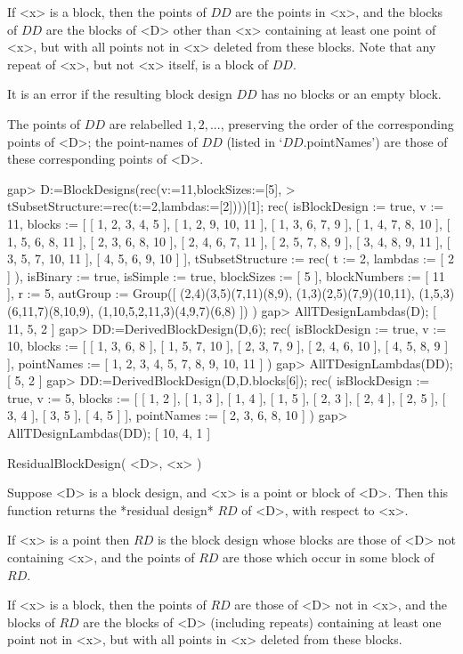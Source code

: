If <x> is a block, then the points of $DD$ are the points in <x>, and
the blocks of $DD$ are the blocks of <D> other than <x> containing at
least one point of <x>, but with all points not in <x> deleted from
these blocks.  Note that any repeat of <x>, but not <x> itself, is a
block of $DD$.

It is an error if the resulting block design $DD$ has no blocks or an
empty block.

The points of $DD$ are relabelled $1,2,...$, preserving the order of
the corresponding points of <D>; the point-names of $DD$ (listed in
`$DD$.pointNames') are those of these corresponding points of <D>.

\beginexample
gap> D:=BlockDesigns(rec(v:=11,blockSizes:=[5],
>       tSubsetStructure:=rec(t:=2,lambdas:=[2])))[1];
rec( isBlockDesign := true, v := 11, 
  blocks := [ [ 1, 2, 3, 4, 5 ], [ 1, 2, 9, 10, 11 ], [ 1, 3, 6, 7, 9 ], 
      [ 1, 4, 7, 8, 10 ], [ 1, 5, 6, 8, 11 ], [ 2, 3, 6, 8, 10 ], 
      [ 2, 4, 6, 7, 11 ], [ 2, 5, 7, 8, 9 ], [ 3, 4, 8, 9, 11 ], 
      [ 3, 5, 7, 10, 11 ], [ 4, 5, 6, 9, 10 ] ], 
  tSubsetStructure := rec( t := 2, lambdas := [ 2 ] ), isBinary := true, 
  isSimple := true, blockSizes := [ 5 ], blockNumbers := [ 11 ], r := 5, 
  autGroup := Group([ (2,4)(3,5)(7,11)(8,9), (1,3)(2,5)(7,9)(10,11), 
      (1,5,3)(6,11,7)(8,10,9), (1,10,5,2,11,3)(4,9,7)(6,8) ]) )
gap> AllTDesignLambdas(D);      
[ 11, 5, 2 ]
gap> DD:=DerivedBlockDesign(D,6);
rec( isBlockDesign := true, v := 10, 
  blocks := [ [ 1, 3, 6, 8 ], [ 1, 5, 7, 10 ], [ 2, 3, 7, 9 ], 
      [ 2, 4, 6, 10 ], [ 4, 5, 8, 9 ] ], 
  pointNames := [ 1, 2, 3, 4, 5, 7, 8, 9, 10, 11 ] )
gap> AllTDesignLambdas(DD);
[ 5, 2 ]
gap> DD:=DerivedBlockDesign(D,D.blocks[6]);
rec( isBlockDesign := true, v := 5, 
  blocks := [ [ 1, 2 ], [ 1, 3 ], [ 1, 4 ], [ 1, 5 ], [ 2, 3 ], [ 2, 4 ], 
      [ 2, 5 ], [ 3, 4 ], [ 3, 5 ], [ 4, 5 ] ], 
  pointNames := [ 2, 3, 6, 8, 10 ] )
gap> AllTDesignLambdas(DD);
[ 10, 4, 1 ]
\endexample 



\>ResidualBlockDesign( <D>, <x> )

Suppose <D> is a block design, and <x> is a point or block of <D>.
Then this function returns the *residual design*
$RD$ of <D>, with respect to <x>.

If <x> is a point then $RD$ is the block design whose blocks are those
of <D> not containing <x>, and the points of $RD$ are those which occur
in some block of $RD$.

If <x> is a block, then the points of $RD$ are those of <D> not in
<x>, and the blocks of $RD$ are the blocks of <D> (including repeats)
containing at least one point not in <x>, but with all points in <x>
deleted from these blocks.

